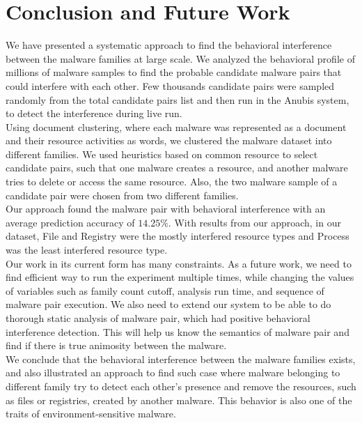 \chapter{Conclusion and Future Work}\label{chapter:conclusion_and_future_work}
We have presented a systematic approach to find the behavioral interference between the malware families at large scale.
We analyzed the behavioral profile of millions of malware samples to find the probable candidate malware pairs that could interfere with each other.
Few thousands candidate pairs were sampled randomly from the total candidate pairs list and then run in the Anubis system, to detect the interference during live run.\\

Using document clustering, where each malware was represented as a document and their resource activities as words, we clustered the malware dataset into different families.
We used heuristics based on common resource to select candidate pairs, such that one malware creates a resource, and another malware tries to delete or access the same resource.
Also, the two malware sample of a candidate pair were chosen from two different families.\\

Our approach found the malware pair with behavioral interference with an average prediction accuracy of $14.25\%$.
With results from our approach, in our dataset, File and Registry were the mostly interfered resource types and Process was the least interfered resource type.\\

Our work in its current form has many constraints.
As a future work, we need to find efficient way to run the experiment multiple times, while changing the values of variables such as family count cutoff, analysis run time, and sequence of malware pair execution.
We also need to extend our system to be able to do thorough static analysis of malware pair, which had positive behavioral interference detection.
This will help us know the semantics of malware pair and find if there is true animosity between the malware.
\\

We conclude that the behavioral interference between the malware families exists, and also illustrated an approach to find such case where malware belonging to different family try to detect each other's presence and remove the resources, such as files or registries, created by another malware.
This behavior is also one of the traits of environment-sensitive malware.

